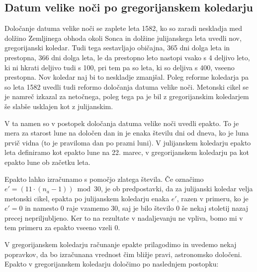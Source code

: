 \documentclass[a4paper,12pt]{article}
\begin{document}
\subsection*{Datum velike noči po gregorijanskem koledarju}

Določanje datuma velike noči se zaplete leta 1582, ko so zaradi neskladja med 
dolžino Zemljinega obhoda okoli Sonca in dolžine julijanskega leta uvedli nov, 
gregorijanski koledar. Tudi tega sestavljajo običajna, 365 dni dolga leta in 
prestopna, 366 dni dolga leta, le da prestopno leto nastopi vsako s 4 deljivo 
leto, ki ni hkrati deljivo tudi s 100, pri tem pa so leta, ki so deljiva s 400, 
vseeno prestopna. Nov koledar naj bi to neskladje zmanjšal.
Poleg reforme koledarja pa so leta 1582 uvedli tudi reformo določanja datuma 
velike noči. Metonski cikel se je namreč izkazal za netočnega, poleg tega pa 
je bil z gregorijanskim koledarjem še slabše usklajen kot z julijanskim. %

V ta namen so v postopek določanja datuma velike noči uvedli epakto. To je 
mera za starost lune na določen dan in je enaka številu dni od dneva, ko je 
luna prvič vidna (to je praviloma dan po prazni luni). V julijanskem koledarju 
epakto leta definiramo kot epakto lune na 22. marec, v gregorijanskem 
koledarju pa kot epakto lune ob začetku leta. %

Epakto lahko izračunamo s pomočjo zlatega števila.
Če označimo $e' = (11 \cdot (n_a - 1)) \bmod 30$, je ob predpostavki, da za 
julijanski koledar velja metonski cikel, epakta po julijanskem koledarju enaka 
$e'$, razen v primeru, ko je $e' = 0$ in namesto 0 raje vzamemo 30, saj je bilo 
število 0 še nekaj stoletij nazaj precej nepriljubljeno. Ker to na rezultate v 
nadaljevanju ne vpliva, bomo mi v tem primeru za epakto vseeno vzeli 0.

V gregorijanskem koledarju računanje epakte prilagodimo in uvedemo nekaj 
popravkov, da bo izračunana vrednost čim bližje pravi, astronomsko določeni. 
Epakto v gregorijanskem koledarju določimo po naslednjem postopku:
\end{document}
